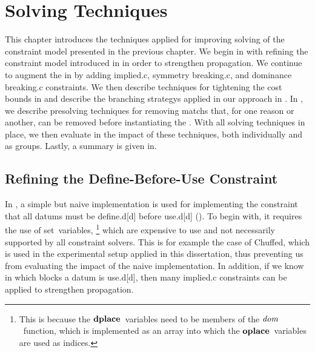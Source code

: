 %

\chapter{Solving Techniques}

This chapter introduces the techniques applied for improving solving of the
\gls{constraint model} presented in the previous chapter.
%
We begin in  with refining the \gls{constraint model}
introduced in  in order to strengthen
\gls{propagation}.
%
We continue to augment the  in
 by adding
\gls{implied.c}, \gls{symmetry breaking.c}, and \gls{dominance breaking.c}
\glspl{constraint}.
%
We then describe techniques for tightening the cost bounds in
 and describe the \glspl{branching strategy} applied
in our approach in .
%
In , we describe \gls{presolving} techniques for
removing \glspl{match} that, for one reason or another, can be removed before
instantiating the .
%
With all solving techniques in place, we then evaluate in
 the impact of these techniques, both
individually and as groups.
%
Lastly, a summary is given in.


\section{Refining the Define-Before-Use Constraint}

In , a simple but naive implementation is used for
implementing the \gls{constraint} that all \glspl{datum} must be
\gls{define.d}[d] before \gls{use.d}[d] ().
%
To begin with, it requires the use of set~\glspl{variable},\!%
%
\footnote{%
  This is because the $\mVar{dplace}$~\glspl{variable} need to be members of the
  $\operatorname{\textrm{\textit{dom}}}$~\gls{function}, which is implemented as an array into which the
  $\mVar{oplace}$~\glspl{variable} are used as indices.%
}
%
which are expensive to use and not necessarily supported by all
\glspl{constraint solver}.
%
This is for example the case of \gls{Chuffed}, which is used in the experimental
setup applied in this dissertation, thus preventing us from evaluating the
impact of the naive implementation.
%
In addition, if we know in which \glspl{block} a \gls{datum} is \gls{use.d}[d],
then many \gls{implied.c} \glspl{constraint} can be applied to strengthen
\gls{propagation}.

